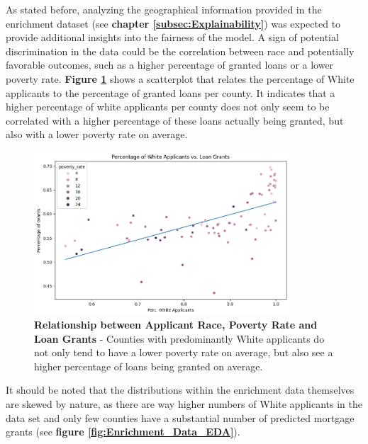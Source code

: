 As stated before, analyzing the geographical information provided in the enrichment dataset (see \textbf{chapter \ref{subsec:Explainability}}) was expected to provide additional insights into the fairness of the model.
A sign of potential discrimination in the data could be the correlation between race and potentially favorable outcomes, such as a higher percentage of granted loans or a lower poverty rate.
\textbf{Figure \ref{fig:Scatter_White_Applicants_Loan_Grant}} shows a scatterplot that relates the percentage of White applicants to the percentage of granted loans per county. It indicates that a higher percentage of white applicants per county does not only seem to be correlated with a higher percentage of these loans actually being granted, but also with a lower poverty rate on average.

\begin{figure}[!htbp]
    \centering
    \includegraphics[width=0.85\textwidth]{images/CHXX_Perc_Grants_vs_Perc_White.png}
    \caption[Relationship between Applicant Race, Poverty Rate and Loan Grants]{\textbf{Relationship between Applicant Race, Poverty Rate and Loan Grants} - Counties with predominantly White applicants do not only tend to have a lower poverty rate on average, but also see a higher percentage of loans being granted on average.}
    \label{fig:Scatter_White_Applicants_Loan_Grant}
\end{figure}

It should be noted that the distributions within the enrichment data themselves are skewed by nature, as there are way higher numbers of White applicants in the data set and only few counties have a substantial number of predicted mortgage grants (see \textbf{figure \ref{fig:Enrichment_Data_EDA}}).

